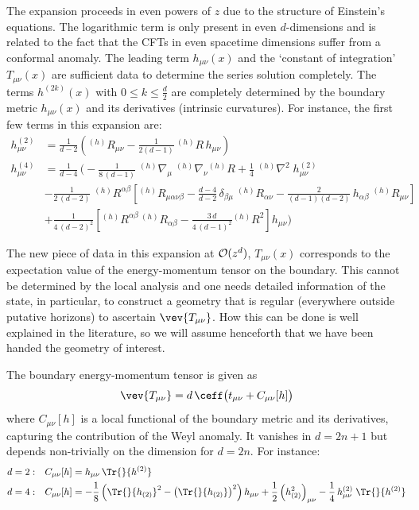 \documentclass[12pt,openany]{book}
\begin{document}
The expansion proceeds in even powers of $z$ due to the structure of Einstein's equations. The logarithmic term is only present in even $d$-dimensions and is related to the fact that the CFTs in even spacetime dimensions suffer from a conformal anomaly. The leading term $h_{\mu\nu}(x)$ and the `constant of integration' $T_{\mu\nu}(x)$ are sufficient data to determine the series solution completely. The terms $h^{(2k)}(x)$ with $0\leq k \leq  \frac{d}{2}$ are completely determined by the boundary metric $h_{\mu\nu}(x)$ and its derivatives (intrinsic curvatures). For instance, the first few terms in this expansion are:
%
\begin{equation}
\begin{split}
h^{(2)}_{\mu\nu} &=
  \frac{1}{d-2}\left( {}^{(h)} R_{\mu\nu} - \frac{1}{2(d-1)}\, {}^{(h)} R\, h_{\mu\nu}\right)
\\
h^{(4)}_{\mu\nu} & =
   \frac{1}{d-4} \, \Bigg(
   - \frac{1}{8\,(d-1)}\; {}^{(h)}\nabla_\mu\;  {}^{(h)}\nabla_\nu {}^{(h)} R
  + \frac{1}{4}\; {}^{(h)}\nabla^2  \; h^{(2)}_{\mu\nu}
\\
&
  -\frac{1}{2\,(d-2)}\; {}^{(h)} R^{\alpha\beta} \left[
    {}^{(h)} R_{\mu\alpha \nu \beta}
  - \frac{d-4}{d-2} \, \delta_{\beta\mu}\;  {}^{(h)} R_{\alpha \nu}
  - \frac{2}{(d-1)(d-2)}\, h_{\alpha\beta} \; {}^{(h)} R_{\mu\nu} \right]
\\
&
  + \frac{1}{4\, (d-2)^2} \left[ {}^{(h)} R^{\alpha \beta} \, {}^{(h)} R_{\alpha \beta}
  - \frac{3\,d}{4\,(d-1)^2} {}^{(h)} R^2\right]   h_{\mu\nu}
    \Bigg)
\end{split}
\label{}
\end{equation}
%


 The new piece of data in this expansion at ${\cal O}(z^d)$, $T_{\mu\nu}(x)$ corresponds to the expectation value of the energy-momentum tensor on the boundary. This cannot be determined by the local analysis and one needs detailed information of the state, in particular, to construct a geometry that is regular (everywhere outside putative horizons) to ascertain $\vev{T_{\mu\nu}}$. How this can be done is well explained in the literature, so we will assume henceforth that we have been handed the geometry of interest.


The boundary energy-momentum tensor is given as  \cite{Henningson:1998gx,Balasubramanian:1999re}
\begin{equation}
\vev{T_{\mu\nu}} = d\,\ceff\big( t_{\mu\nu} + C_{\mu\nu}[h]\big)
\end{equation}
%
where $C_{\mu\nu}[h]$ is a local functional of the boundary metric and its derivatives, capturing the contribution of the Weyl anomaly. It vanishes in $d=2n+1$ but depends non-trivially on the dimension for $d=2n$. For instance:
%
\begin{equation}
\begin{split}
d=2: & \quad C_{\mu\nu}[h]
  = h_{\mu\nu} \, \Tr{}{h^{(2)}}
\\
d=4: & \quad C_{\mu\nu}[h]
  = -\frac{1}{8} \left(
  \Tr{}{h_{(2)}}^2 -  \left(\Tr{}{h_{(2)}}\right)^2\right)  h_{\mu\nu}
  +\frac{1}{2} \left(h_{(2)}^2\right)_{\mu\nu} - \frac{1}{4}\, h^{(2)}_{\mu\nu} \;\Tr{}{h^{(2)}}
\end{split}
\label{eq:Canom}
\end{equation}
%
\end{document}
